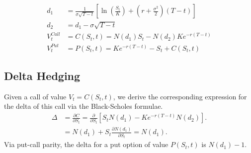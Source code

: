 \documentclass{article}
\begin{document}
		
	
	
\begin{align*}
	d_1 &= \frac{1}{\sigma \sqrt{T-t}}\left[\ln\left(\frac{S_t}{K}\right) + \left(r + \frac{\sigma^2}{2}\right)(T-t) \right] \\
	d_2 &= d_1 - \sigma\sqrt{T-t}\\
	V_{t}^{Call} &= C(S_t, t) = N(d_1)S_t - N(d_2) Ke^{-r(T-t)} \\
	V_{t}^{Put} &= P(S_{t}, t) = Ke^{-r(T-t)} -S_t + C(S_t,t)
\end{align*}


\subsection{Delta Hedging}

Given a call of value $ V_t = C(S_{t},t) $, we derive the corresponding expression for the delta of this call via the Black-Scholes formulae.
\begin{align*}
	\Delta &= \frac{\partial C}{\partial S_t} = \frac{\partial}{\partial S_t} \left[ S_t N(d_1) - Ke^{-r(T-t)} N(d_2) \right].\\
	&= N(d_1) + S_t \frac{\partial N(d_1)}{\partial S_t} = N(d_{1}). 
\end{align*}
Via put-call parity, the delta for a put option of value $ P(S_{t},t) $ is $ N(d_{1})-1 $.
\end{document}
